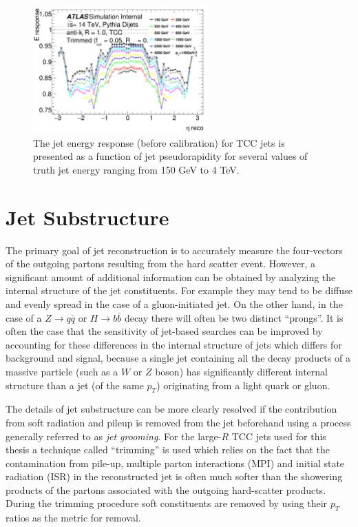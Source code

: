 \begin{figure}
	\centering
	\includegraphics[width=0.6\textwidth]{tcc_jet_e_response}
	\caption{
	The jet energy response (before calibration) for TCC jets is presented as a function of jet pseudorapidity for several values of truth jet energy ranging from 150 GeV to 4 TeV.
	}
	\label{fig:tcc_jet_e_response}
\end{figure}

\section{Jet Substructure}
\label{sec:jet_substructure}
The primary goal of jet reconstruction is to accurately measure the four-vectors of the outgoing partons resulting from the hard scatter event.
However, a significant amount of additional information can be obtained by analyzing the internal structure of the jet constituents.
For example they may tend to be diffuse and evenly spread in the case of a gluon-initiated jet.
On the other hand, in the case of a $Z \rightarrow q\bar{q}$ or $H \rightarrow b\bar{b}$ decay there will often be two distinct ``prongs''.
It is often the case that the sensitivity of jet-based searches can be improved by accounting for these differences in the internal structure of jets which differs for background and signal, because a single jet containing all the decay products of a massive particle (such as a $W$ or $Z$ boson) has significantly different internal structure than a jet (of the same $p_T$) originating from a light quark or gluon.

The details of jet substructure can be more clearly resolved if the contribution from soft radiation and pileup is removed from the jet beforehand using a process generally referred to as \textit{jet grooming}.
For the large-$R$ TCC jets used for this thesis a technique called ``trimming'' is used which relies on the fact that the contamination from pile-up, multiple parton interactions (MPI) and initial state radiation (ISR) in the reconstructed jet is often much softer than the showering products of the partons associated with the outgoing hard-scatter products.
During the trimming procedure soft constituents are removed by using their $p_T$ ratios as the metric for removal.

